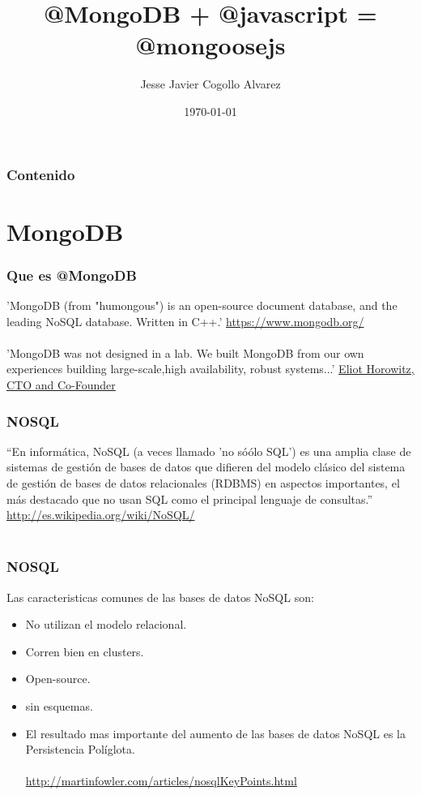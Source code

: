 \documentclass{beamer}
\title[@Mongoosejs]{@MongoDB + @javascript = @mongoosejs}
\author{Jesse Javier Cogollo Alvarez}
\institute[EAFIT]
{
Developer by passion \\
\medskip
\textit{twitter: @jessecogollo}
}
\date{\today}
\begin{document}
	\begin{frame}
		\titlepage %
	\end{frame}

	\begin{frame}
		\frametitle{Contenido}
		\tableofcontents
	\end{frame}


\section{MongoDB}
\begin{frame}
\frametitle{Que es @MongoDB}
'MongoDB (from "humongous") is an open-source document database, and the leading NoSQL database. Written in C++.'
{\color{blue}\url{https://www.mongodb.org/}}
\pause
\\~\\
'MongoDB was not designed in a lab. We built MongoDB from our own experiences building large-scale,high availability, robust systems...'
\underline{\color{green}Eliot Horowitz, CTO and Co-Founder}	
\end{frame}
\begin{frame}
\frametitle{NOSQL}
“En inform\'atica, NoSQL (a veces llamado 'no só\'olo SQL') es una amplia clase de sistemas de gesti\'on de bases de datos que difieren del modelo cl\'asico del sistema de gesti\'on de bases de datos relacionales (RDBMS) en aspectos importantes, el m\'as destacado que no usan SQL como el principal lenguaje de consultas.” {\color{blue}\url{http://es.wikipedia.org/wiki/NoSQL/}}
\\~\\
\end{frame}

\begin{frame}
\frametitle{NOSQL}
Las caracteristicas comunes de las bases de datos NoSQL son:
\begin{itemize}[<+->]
\item No utilizan el modelo relacional.
\item Corren bien en clusters.
\item Open-source.
\item sin esquemas.
\item El resultado mas importante del aumento de las bases de datos NoSQL es la {\color{green}Persistencia Pol\'iglota}.
\\~\\
{\color{blue}\url{http://martinfowler.com/articles/nosqlKeyPoints.html}}
\end{itemize}

\end{frame}
\end{document}
